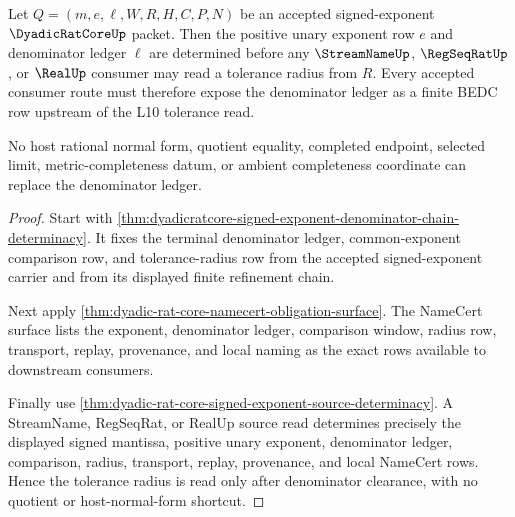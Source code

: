 \begin{theorem}
\label{thm:dyadicratcore-signed-exponent-denominator-clearance}
Let $Q=(m,e,\ell,W,R,H,C,P,N)$ be an accepted signed-exponent $\DyadicRatCoreUp$ packet. Then the positive unary exponent row $e$ and denominator ledger $\ell$ are determined before any $\StreamNameUp$, $\RegSeqRatUp$, or $\RealUp$ consumer may read a tolerance radius from $R$. Every accepted consumer route must therefore expose the denominator ledger as a finite BEDC row upstream of the L10 tolerance read.

No host rational normal form, quotient equality, completed endpoint, selected limit, metric-completeness datum, or ambient completeness coordinate can replace the denominator ledger.
\end{theorem}
\begin{proof}
Start with \autoref{thm:dyadicratcore-signed-exponent-denominator-chain-determinacy}. It fixes the terminal denominator ledger, common-exponent comparison row, and tolerance-radius row from the accepted signed-exponent carrier and from its displayed finite refinement chain.

Next apply \autoref{thm:dyadic-rat-core-namecert-obligation-surface}. The NameCert surface lists the exponent, denominator ledger, comparison window, radius row, transport, replay, provenance, and local naming as the exact rows available to downstream consumers.

Finally use \autoref{thm:dyadic-rat-core-signed-exponent-source-determinacy}. A StreamName, RegSeqRat, or RealUp source read determines precisely the displayed signed mantissa, positive unary exponent, denominator ledger, comparison, radius, transport, replay, provenance, and local NameCert rows. Hence the tolerance radius is read only after denominator clearance, with no quotient or host-normal-form shortcut.
\end{proof}

